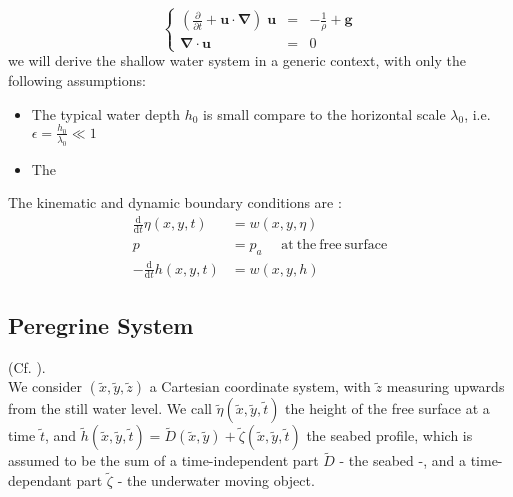 \documentclass[11pt,a4paper]{article}
\begin{document}
\begin{equation}
	\left\lbrace
		\begin{array}{rll}
\displaystyle (\frac{\partial}{\partial t} + \mathbf{u} \cdot \mathbf{\nabla}) \; \mathbf{u} & = & \displaystyle -\frac{1}{\rho} + \mathbf{g} \\
\mathbf{\nabla} \cdot \mathbf{u} & = & 0 
		\end{array}
	\right.
\end{equation}
we will derive the shallow water system in a generic context, with only the following assumptions: 
\begin{itemize}
\item The typical water depth $h_0$ is small compare to the horizontal scale $\lambda_0$, i.e. $\epsilon = \frac{h_0}{\lambda_0} \ll 1 $
\item The
\end{itemize}
The kinematic and dynamic boundary conditions are : 
\begin{align}
\frac{\mathrm{d}}{\mathrm{d} t} \eta(x,y,t) & = w(x,y,\eta) \\
p & = p_a \: \: \:  \: \: \: \mathrm{at} \: \mathrm{the} \:  \mathrm{free} \: \mathrm{surface}\\
-\frac{\mathrm{d}}{\mathrm{d}t} h(x,y,t) & = w(x,y,h)
\end{align}



\pagebreak

\subsection{Peregrine System}
(Cf. \cite{DM2013}).\\ We consider $(\tilde{x},\tilde{y},\tilde{z})$ a Cartesian coordinate system, with $\tilde{z}$ measuring upwards from the still water level. We call $\tilde{\eta}(\tilde{x},\tilde{y},\tilde{t})$ the height of the free surface at a time $\tilde{t}$, and $\tilde{h}(\tilde{x},\tilde{y},\tilde{t}) = \tilde{D}(\tilde{x},\tilde{y}) + \tilde{\zeta}(\tilde{x},\tilde{y},\tilde{t})$ the seabed profile, which is assumed to be the sum of a time-independent part $\tilde{D}$ - the seabed -, and a time-dependant part $\tilde{\zeta}$ - the underwater moving object.
\end{document}
